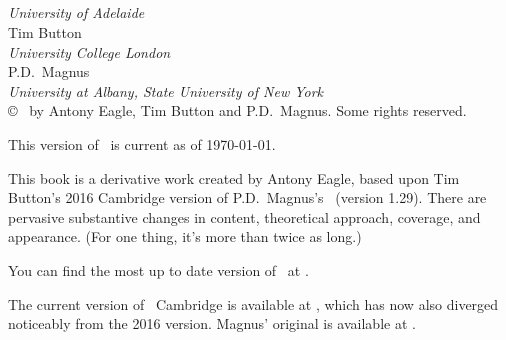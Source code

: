 \begin{titlingpage}

~\\[4cm]
\begin{center}\forallxadl \end{center}\end{titlingpage}

\newpage \thispagestyle{empty} ~\\
~\\[2cm]
\noindent {}

\vfill


\\
\emph{University of Adelaide}\\[1.5cm]

{Tim Button}\\
\emph{University College London}\\[1.5cm]

{P.D.\ Magnus}\\
\emph{University at Albany, State University of New York}
\newpage \thispagestyle{empty} ~\\
\copyright\  by Antony Eagle, Tim Button and P.D.\ Magnus. Some rights reserved.

This version of \forallxadl\ is current as of \today.

\medskip\thispagestyle{empty}%

This book is a derivative work created by Antony Eagle, based upon Tim Button's 2016 Cambridge version of P.D.\ Magnus's \forallx\ (version 1.29). There are pervasive substantive changes in content, theoretical approach, coverage, and appearance. (For one thing, it's more than twice as long.)

You can find the most up to date version of \forallxadl\ at . 

The current version of \forallx\ Cambridge is available at , which has now also diverged noticeably from the 2016 version. Magnus' original is available at . 

